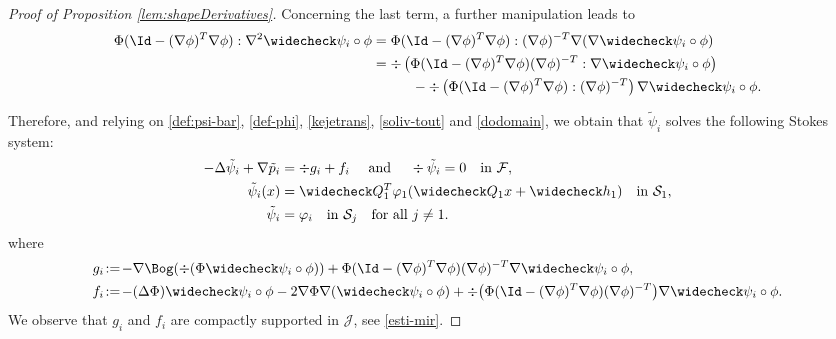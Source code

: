 \begin{proof}[Proof of Proposition \ref{lem:shapeDerivatives}]
Concerning the last term, a further manipulation leads to
\begin{align*}
\Phi (\Id - (\nabla \phi)^T \nabla \phi) : \nabla^2 \widecheck \psi_i \circ \phi &= \Phi (\Id - (\nabla \phi)^T\nabla \phi) :(\nabla \phi)^{-T} \nabla(\nabla \widecheck \psi_i \circ \phi) \\
&= \div \left(\Phi (\Id - (\nabla \phi)^T \nabla \phi) (\nabla \phi)^{-T} : \nabla \widecheck \psi_i \circ \phi \right) \\
&\hspace*{1cm} - \div\left(\Phi (\Id - (\nabla \phi)^T\nabla \phi) : (\nabla \phi)^{-T} \right) \nabla \widecheck \psi_i \circ \phi.
\end{align*}

Therefore, and relying on \eqref{def:psi-bar}, \eqref{def-phi}, \eqref{kejetrans}, \eqref{soliv-tout} and
\eqref{dodomain},
we obtain that $\tilde \psi_i$ solves the following Stokes system:
\begin{subequations}
\label{subtilde}
\begin{align}
- \Delta \tilde \psi_i + \nabla \tilde p_i &= \div g_i + f_i \quad \text{ and } \quad \div \tilde \psi_i = 0 \quad \text{in } \mathcal F, \\
\tilde \psi_i (x) &= \widecheck Q_1^T \varphi_1(\widecheck Q_1 x + \widecheck h_1) \quad \text{in } \mathcal S_1, \\
\tilde \psi_i &= \varphi_i \quad \text{in } \mathcal S_j \quad \text{for all } j \neq 1.
\end{align}
\end{subequations}
where
\begin{align}
g_i &\!:=\! - \nabla \Bog (\div (\Phi \widecheck \psi_i \circ \phi)) + \Phi (\Id - (\nabla \phi)^T\nabla \phi) (\nabla \phi)^{-T} \nabla \widecheck \psi_i \circ \phi, \label{def:g_i}\\
f_i &\!:=\! -(\Delta \Phi) \widecheck \psi_i \circ \phi - 2 \nabla \Phi \nabla (\widecheck \psi_i \circ \phi)
+ \div\bigl(\Phi (\Id - (\nabla \phi)^T\nabla \phi) (\nabla \phi)^{-T} \bigr) \nabla \widecheck \psi_i \circ \phi. \label{def:f_i}
\end{align}
We observe that $g_i$ and $f_i$ are compactly supported in $ \mathcal J$, see \eqref{esti-mir}.


\end{proof}
